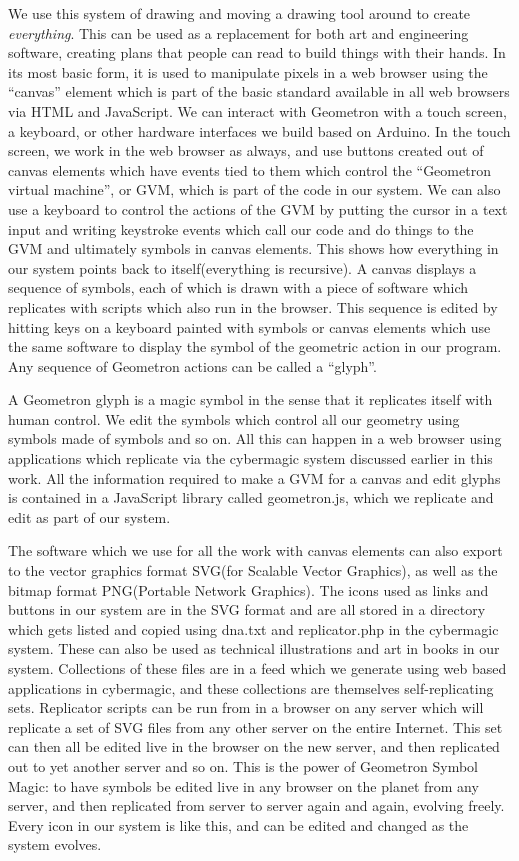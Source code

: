 We use this system of drawing and moving a drawing tool around to create
\emph{everything}. This can be used as a replacement for both art and
engineering software, creating plans that people can read to build
things with their hands. In its most basic form, it is used to
manipulate pixels in a web browser using the ``canvas'' element which is
part of the basic standard available in all web browsers via HTML and
JavaScript. We can interact with Geometron with a touch screen, a
keyboard, or other hardware interfaces we build based on Arduino. In the
touch screen, we work in the web browser as always, and use buttons
created out of canvas elements which have events tied to them which
control the ``Geometron virtual machine'', or GVM, which is part of the
code in our system. We can also use a keyboard to control the actions of
the GVM by putting the cursor in a text input and writing keystroke
events which call our code and do things to the GVM and ultimately
symbols in canvas elements. This shows how everything in our system
points back to itself(everything is recursive). A canvas displays a
sequence of symbols, each of which is drawn with a piece of software
which replicates with scripts which also run in the browser. This
sequence is edited by hitting keys on a keyboard painted with symbols or
canvas elements which use the same software to display the symbol of the
geometric action in our program. Any sequence of Geometron actions can
be called a ``glyph''.

A Geometron glyph is a magic symbol in the sense that it replicates
itself with human control. We edit the symbols which control all our
geometry using symbols made of symbols and so on. All this can happen in
a web browser using applications which replicate via the cybermagic
system discussed earlier in this work. All the information required to
make a GVM for a canvas and edit glyphs is contained in a JavaScript
library called geometron.js, which we replicate and edit as part of our
system.

The software which we use for all the work with canvas elements can also
export to the vector graphics format SVG(for Scalable Vector Graphics),
as well as the bitmap format PNG(Portable Network Graphics). The icons
used as links and buttons in our system are in the SVG format and are
all stored in a directory which gets listed and copied using dna.txt and
replicator.php in the cybermagic system. These can also be used as
technical illustrations and art in books in our system. Collections of
these files are in a feed which we generate using web based applications
in cybermagic, and these collections are themselves self-replicating
sets. Replicator scripts can be run from in a browser on any server
which will replicate a set of SVG files from any other server on the
entire Internet. This set can then all be edited live in the browser on
the new server, and then replicated out to yet another server and so on.
This is the power of Geometron Symbol Magic: to have symbols be edited
live in any browser on the planet from any server, and then replicated
from server to server again and again, evolving freely. Every icon in
our system is like this, and can be edited and changed as the system
evolves.

